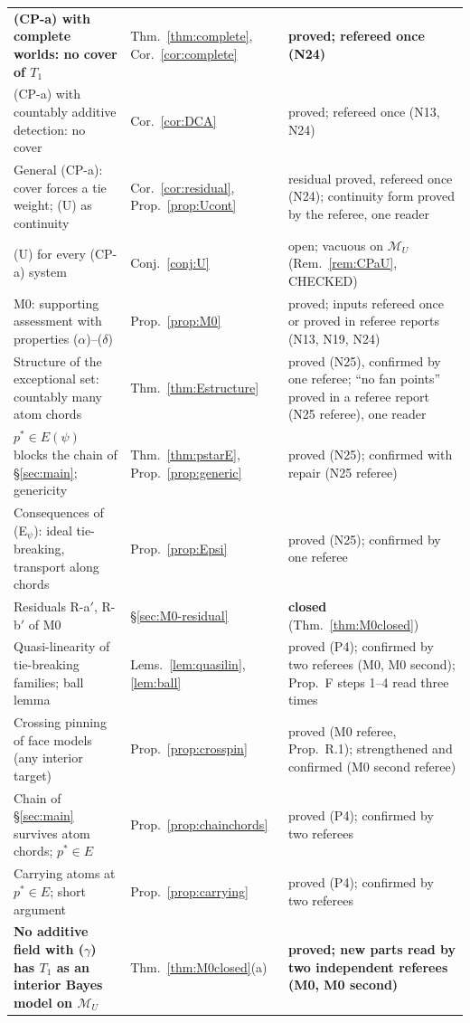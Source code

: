 \documentclass[11pt]{article}
\theoremstyle{definition}
\theoremstyle{remark}
\newcommand{\M}{\mathcal M}
\begin{document}
{\begin{longtable}{>{\raggedright\arraybackslash}p{6.4cm}>{\raggedright\arraybackslash}p{2.1cm}>{\raggedright\arraybackslash}p{5.6cm}}
\textbf{(CP-a) with complete worlds: no cover of $T_1$} & Thm.~\ref{thm:complete}, Cor.~\ref{cor:complete} & \textbf{proved; refereed once (N24)}\\
(CP-a) with countably additive detection: no cover & Cor.~\ref{cor:DCA} & proved; refereed once (N13, N24)\\
General (CP-a): cover forces a tie weight; (U) as continuity & Cor.~\ref{cor:residual}, Prop.~\ref{prop:Ucont} & residual proved, refereed once (N24); continuity form proved by the referee, one reader\\
(U) for every (CP-a) system & Conj.~\ref{conj:U} & open; vacuous on $\M_U$ (Rem.~\ref{rem:CPaU}, CHECKED)\\
M0: supporting assessment with properties ($\alpha$)--($\delta$) & Prop.~\ref{prop:M0} & proved; inputs refereed once or proved in referee reports (N13, N19, N24)\\
Structure of the exceptional set: countably many atom chords & Thm.~\ref{thm:Estructure} & proved (N25), confirmed by one referee; ``no fan points'' proved in a referee report (N25 referee), one reader\\
$p^*\in E(\psi)$ blocks the chain of \S\ref{sec:main}; genericity & Thm.~\ref{thm:pstarE}, Prop.~\ref{prop:generic} & proved (N25); confirmed with repair (N25 referee)\\
Consequences of (E$_\psi$): ideal tie-breaking, transport along chords & Prop.~\ref{prop:Epsi} & proved (N25); confirmed by one referee\\
Residuals R-a$'$, R-b$'$ of M0 & \S\ref{sec:M0-residual} & \textbf{closed} (Thm.~\ref{thm:M0closed})\\
Quasi-linearity of tie-breaking families; ball lemma & Lems.~\ref{lem:quasilin}, \ref{lem:ball} & proved (P4); confirmed by two referees (M0, M0 second); Prop.~F steps 1--4 read three times\\
Crossing pinning of face models (any interior target) & Prop.~\ref{prop:crosspin} & proved (M0 referee, Prop.~R.1); strengthened and confirmed (M0 second referee)\\
Chain of \S\ref{sec:main} survives atom chords; $p^*\in E$ & Prop.~\ref{prop:chainchords} & proved (P4); confirmed by two referees\\
Carrying atoms at $p^*\in E$; short argument & Prop.~\ref{prop:carrying} & proved (P4); confirmed by two referees\\
\textbf{No additive field with ($\gamma$) has $T_1$ as an interior Bayes model on $\M_U$} & Thm.~\ref{thm:M0closed}(a) & \textbf{proved; new parts read by two independent referees (M0, M0 second)}\\

\end{longtable}}
\end{document}
